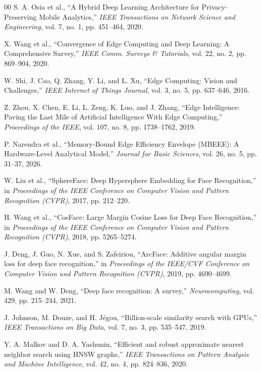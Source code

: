 \documentclass[conference]{IEEEtran}
\begin{document}
\begin{thebibliography}{00}
 S. A. Osia et al., ``A Hybrid Deep Learning Architecture for Privacy-Preserving Mobile Analytics,'' \textit{IEEE Transactions on Network Science and Engineering}, vol. 7, no. 1, pp. 451--464, 2020.

 X. Wang et al., ``Convergence of Edge Computing and Deep Learning: A Comprehensive Survey,'' \textit{IEEE Comm. Surveys \& Tutorials}, vol. 22, no. 2, pp. 869--904, 2020.

 W. Shi, J. Cao, Q. Zhang, Y. Li, and L. Xu, ``Edge Computing: Vision and Challenges,'' \textit{IEEE Internet of Things Journal}, vol. 3, no. 5, pp. 637--646, 2016.

 Z. Zhou, X. Chen, E. Li, L. Zeng, K. Luo, and J. Zhang, ``Edge Intelligence: Paving the Last Mile of Artificial Intelligence With Edge Computing,'' \textit{Proceedings of the IEEE}, vol. 107, no. 8, pp. 1738--1762, 2019.

 P. Narendra et al., ``Memory-Bound Edge Efficiency Envelope (MBEEE): A Hardware-Level Analytical Model,'' \textit{Journal for Basic Sciences}, vol. 26, no. 5, pp. 31--37, 2026.

 W. Liu et al., ``SphereFace: Deep Hypersphere Embedding for Face Recognition,'' in \textit{Proceedings of the IEEE Conference on Computer Vision and Pattern Recognition (CVPR)}, 2017, pp. 212--220.

 H. Wang et al., ``CosFace: Large Margin Cosine Loss for Deep Face Recognition,'' in \textit{Proceedings of the IEEE Conference on Computer Vision and Pattern Recognition (CVPR)}, 2018, pp. 5265--5274.

 J. Deng, J. Guo, N. Xue, and S. Zafeiriou, ``ArcFace: Additive angular margin loss for deep face recognition,'' in \textit{Proceedings of the IEEE/CVF Conference on Computer Vision and Pattern Recognition (CVPR)}, 2019, pp. 4690--4699.

 M. Wang and W. Deng, ``Deep face recognition: A survey,'' \textit{Neurocomputing}, vol. 429, pp. 215--244, 2021.

 J. Johnson, M. Douze, and H. J\'{e}gou, ``Billion-scale similarity search with GPUs,'' \textit{IEEE Transactions on Big Data}, vol. 7, no. 3, pp. 535--547, 2019.

 Y. A. Malkov and D. A. Yashunin, ``Efficient and robust approximate nearest neighbor search using HNSW graphs,'' \textit{IEEE Transactions on Pattern Analysis and Machine Intelligence}, vol. 42, no. 4, pp. 824--836, 2020.


\end{thebibliography}
\end{document}

